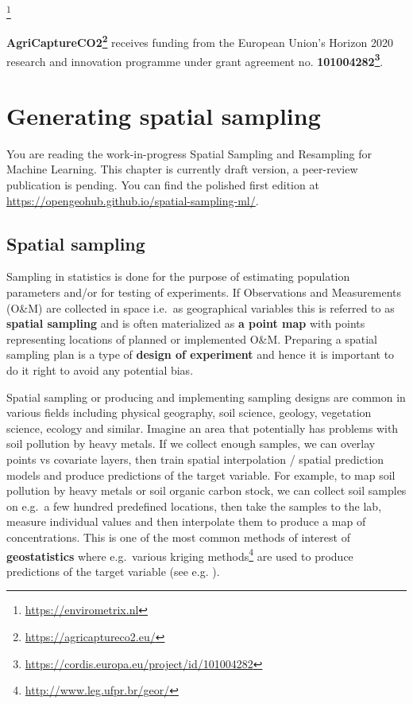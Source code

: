 \documentclass[
  graybox,natbib,nospthms]{svmono}
\renewcommand{\href}[2]{#2 (\url{#1})}
\renewcommand{\href}[2]{#2\footnote{\url{#1}}}
\begin{document}
\href{https://envirometrix.nl}{}

\textbf{\href{https://agricaptureco2.eu/}{AgriCaptureCO2}} receives funding from the European Union's Horizon 2020 research and innovation programme under grant agreement no. \textbf{\href{https://cordis.europa.eu/project/id/101004282}{101004282}}.

\hypertarget{generating-spatial-sampling}{%
\chapter{Generating spatial sampling}\label{generating-spatial-sampling}}

You are reading the work-in-progress Spatial Sampling and Resampling for Machine Learning. This chapter is currently draft version, a peer-review publication is pending. You can find the polished first edition at \url{https://opengeohub.github.io/spatial-sampling-ml/}.

\hypertarget{spatial-sampling}{%
\section{Spatial sampling}\label{spatial-sampling}}

Sampling in statistics is done for the purpose of estimating population
parameters and/or for testing of experiments. If Observations and
Measurements (O\&M) are collected in space i.e.~as geographical variables
this is referred to as \textbf{spatial sampling} and is often materialized as
\textbf{a point map} with points representing locations of planned or
implemented O\&M. Preparing a spatial sampling plan is a type of \textbf{design
of experiment} and hence it is important to do it right to avoid any
potential bias.

Spatial sampling or producing and implementing sampling designs are
common in various fields including physical geography, soil science,
geology, vegetation science, ecology and similar. Imagine an area that
potentially has problems with soil pollution by heavy metals. If we
collect enough samples, we can overlay points vs covariate layers, then
train spatial interpolation / spatial prediction models and produce
predictions of the target variable. For example, to map soil pollution
by heavy metals or soil organic carbon stock, we can collect soil
samples on e.g.~a few hundred predefined locations, then take the
samples to the lab, measure individual values and then interpolate them
to produce a map of concentrations. This is one of the most common
methods of interest of \textbf{geostatistics} where e.g.~various \href{http://www.leg.ufpr.br/geor/}{kriging methods}
are used to produce predictions of the target variable (see e.g.
\citet{Bivand2013Springer}).
\end{document}
